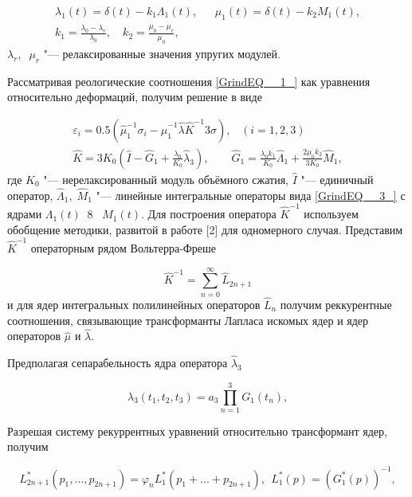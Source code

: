 \begin{equation} \label{GrindEQ__4_} \begin{array}{l} {\lambda _{1} (t)=\delta (t)-k_{1} \Lambda _{1} (t),\quad \; \; \mu _{1} (t)=\delta (t)-k_{2} M_{1} (t),} \\ {k_{1} =\frac{\lambda _{0} -\lambda _{r} }{\lambda _{0} } ,\quad k_{2} =\frac{\mu _{0} -\mu _{r} }{\mu _{0} } ,\quad } \end{array} \end{equation}
$\lambda _{r} ,\; \; \mu _{r} $ "--- релаксированные значения упругих модулей.

 Рассматривая реологические соотношения \eqref{GrindEQ__1_} как уравнения относительно деформаций, получим решение в виде

\begin{equation} \label{GrindEQ__5_} \begin{array}{l} {\varepsilon _{i} =0.5(\hat{\mu }_{1} ^{-1} \sigma _{i} -\hat{\mu }_{1} ^{-1} \hat{\lambda }\hat{K}^{-1} 3\sigma ),\; \; \; (i=1,2,3)} \\ {\hat{K}=3K_{0} \left(\hat{I}-\hat{G}_{1} +\frac{\lambda _{0} }{K_{0} } \hat{\lambda }_{3} \right),\quad \quad \hat{G}_{1} =\frac{\lambda _{0} k_{1} }{K_{0} } \hat{\Lambda }_{1} +\frac{2\mu _{0} k_{2} }{3K_{0} } \hat{M}_{1} ,} \end{array} \end{equation}
где $K_{0} $ "--- нерелаксированный модуль объёмного сжатия, $\hat{I}$ "--- единичный оператор, $\hat{\Lambda }_{1} ,\; \hat{M}_{1} $ "--- линейные интегральные операторы вида \eqref{GrindEQ__3_} с ядрами $\Lambda _{1} (t)\; \; 8\; \; \; M_{1} (t)$.  Для построения оператора $\hat{K}^{-1} $ используем обобщение методики, развитой в работе [2] для одномерного случая. Представим $\hat{K}^{-1} $ операторным рядом Вольтерра-Фреше

\[\hat{K}^{-1} =\sum _{n=0}^{\infty }\hat{L}_{2n+1}  \]
и для ядер интегральных полилинейных операторов $\hat{L}_{n} $ получим реккурентные соотношения, связывающие трансформанты Лапласа искомых ядер и ядер операторов $\hat{\mu }$ и $\hat{\lambda }$.

 Предполагая сепарабельность ядра оператора $\hat{\lambda }_{3} $

\[\lambda _{3} (t_{1} ,t_{2} ,t_{3} )=a_{3} \prod _{n=1}^{3}G_{1}  (t_{n} ),\]

Разрешая систему рекуррентных уравнений относительно трансформант ядер, получим

\begin{equation} \label{GrindEQ__6_} L^{*} _{2n+1} (p_{1} ,...,p_{2n+1} )=\varphi _{n} L_{1}^{*} (p_{1} +...+p_{2n+1} ),~~ L_{1}^{*} (p)=\left(G_{1}^{*} (p)\right)^{-1} , \end{equation}

